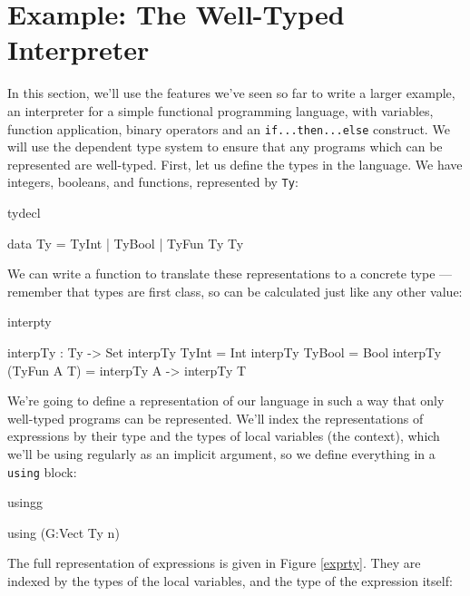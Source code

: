 \section{Example: The Well-Typed Interpreter}

\label{sect:interp}

In this section, we'll use the features we've seen so far to write a larger
example, an interpreter for a simple functional programming language, with
variables, function application, binary operators and an \texttt{if...then...else}
construct. We will use the dependent type system to ensure that any programs
which can be represented are well-typed. First, let us define the types in the
language. We have integers, booleans, and functions, represented by \texttt{Ty}:

\begin{SaveVerbatim}{tydecl}

data Ty = TyInt | TyBool | TyFun Ty Ty

\end{SaveVerbatim}

\noindent
We can write a function to translate these representations to a concrete \Idris{}
type --- remember that types are first class, so can be calculated just like
any other value:

\begin{SaveVerbatim}{interpty}

interpTy : Ty -> Set
interpTy TyInt       = Int
interpTy TyBool      = Bool
interpTy (TyFun A T) = interpTy A -> interpTy T

\end{SaveVerbatim}

\noindent
We're going to define a representation of our language in such a way that only
well-typed programs can be represented. We'll index the representations of
expressions by their type and the types of local variables (the context), which
we'll be using regularly as an implicit argument, so we define everything
in a \texttt{using} block:

\begin{SaveVerbatim}{usingg}

using (G:Vect Ty n)

\end{SaveVerbatim}

\noindent
The full representation of expressions is given in Figure \ref{exprty}. They are
indexed by the types of the local variables, and the type of the expression itself:

